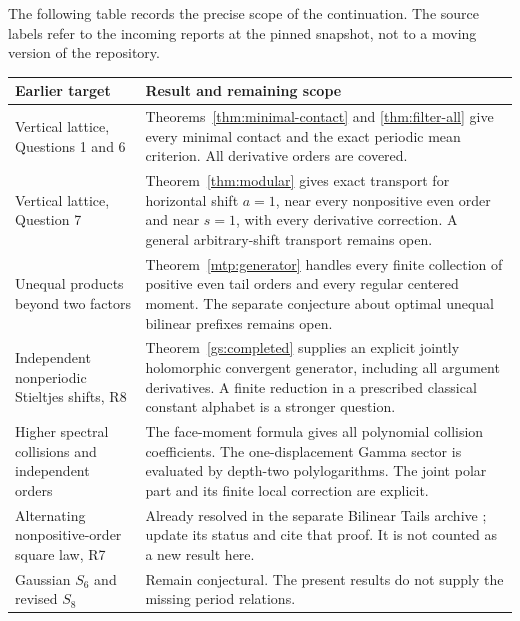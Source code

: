 \documentclass[11pt,letterpaper]{article}
\numberwithin{equation}{section}
\theoremstyle{definition}
\theoremstyle{remark}
\begin{document}
The following table records the precise scope of the continuation.
The source labels refer to the incoming reports at the pinned
snapshot, not to a moving version of the repository.

\begin{longtable}{@{}>{\raggedright\arraybackslash}p{}>{\raggedright\arraybackslash}p{}@{}}
\toprule
\textbf{Earlier target} & \textbf{Result and remaining scope}\\
\midrule
\endhead
Vertical lattice, Questions 1 and 6 \cite{RepoVertical}
&
Theorems~\ref{thm:minimal-contact} and \ref{thm:filter-all}
give every minimal contact and the exact periodic mean criterion.
All derivative orders are covered.\\[5pt]
Vertical lattice, Question 7 \cite{RepoVertical}
&
Theorem~\ref{thm:modular} gives exact transport for horizontal
shift \(a=1\), near every nonpositive even order and near \(s=1\),
with every derivative correction. A general arbitrary-shift
transport remains open.\\[5pt]
Unequal products beyond two factors \cite{RepoBernoulli,RepoMixed}
&
Theorem~\ref{mtp:generator} handles every finite collection of
positive even tail orders and every regular centered moment.
The separate conjecture about optimal unequal bilinear
prefixes remains open.\\[5pt]
Independent nonperiodic Stieltjes shifts, R8 \cite{RepoTailKernels}
&
Theorem~\ref{gs:completed} supplies an explicit jointly
holomorphic convergent generator, including all argument
derivatives. A finite reduction in a prescribed classical
constant alphabet is a stronger question.\\[5pt]
Higher spectral collisions and independent orders
\cite{RepoBernoulli}
&
The face-moment formula gives all polynomial collision
coefficients. The one-displacement Gamma sector is evaluated
by depth-two polylogarithms. The joint polar part and its
finite local correction are explicit.\\[5pt]
Alternating nonpositive-order square law, R7
\cite{RepoTailKernels}
&
Already resolved in the separate Bilinear Tails archive
\cite{RepoBilinear}; update its status and cite that
proof. It is not counted as a new result here.\\[5pt]
Gaussian \(S_6\) and revised \(S_8\)
\cite{RepoManuscript}
&
Remain conjectural. The present results do not supply the
missing period relations.\\
\bottomrule
\end{longtable}
\end{document}
